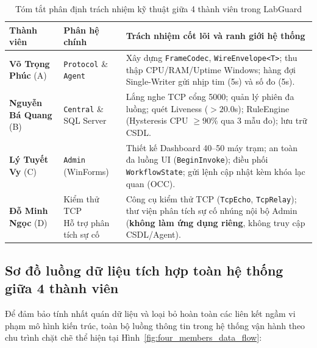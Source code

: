 \documentclass[12pt,a4paper]{article}
\begin{document}
\begin{table}[H]
  \centering
  \caption{Tóm tắt phân định trách nhiệm kỹ thuật giữa 4 thành viên trong LabGuard}
  \label{tab:team_responsibilities}
  \small
  \begin{tabularx}{\textwidth}{|l|l|X|}
    \hline
    \rowcolor{lgDeepBlue}
    \color{white}\textbf{Thành viên} & \color{white}\textbf{Phân hệ chính} & \color{white}\textbf{Trách nhiệm cốt lõi và ranh giới hệ thống} \\
    \hline
    \textbf{Võ Trọng Phúc} (A) & \texttt{Protocol} \& \texttt{Agent} & Xây dựng \texttt{FrameCodec}, \texttt{WireEnvelope<T>}; thu thập CPU/RAM/Uptime Windows; hàng đợi Single-Writer gửi nhịp tim (5s) và số đo (5s). \\
    \hline
    \textbf{Nguyễn Bá Quang} (B) & \texttt{Central} \& SQL Server & Lắng nghe TCP cổng 5000; quản lý phiên đa luồng; quét Liveness ($> 20.0$s); RuleEngine (Hysteresis CPU $\ge 90\%$ qua 3 mẫu đo); lưu trữ CSDL. \\
    \hline
    \textbf{Lý Tuyết Vy} (C) & \texttt{Admin} (WinForms) & Thiết kế Dashboard 40--50 máy trạm; an toàn đa luồng UI (\texttt{BeginInvoke}); điều phối \texttt{WorkflowState}; gửi lệnh cập nhật kèm khóa lạc quan (OCC). \\
    \hline
    \textbf{Đỗ Minh Ngọc} (D) & \makecell[l]{Kiểm thử TCP\\Hỗ trợ phân tích sự cố} & Công cụ kiểm thử TCP (\texttt{TcpEcho}, \texttt{TcpRelay}); thư viện phân tích sự cố nhúng nội bộ Admin (\textbf{không làm ứng dụng riêng}, không truy cập CSDL/Agent). \\
    \hline
  \end{tabularx}
\end{table}

\subsection{Sơ đồ luồng dữ liệu tích hợp toàn hệ thống giữa 4 thành viên}

Để đảm bảo tính nhất quán dữ liệu và loại bỏ hoàn toàn các liên kết ngầm vi phạm mô hình kiến trúc, toàn bộ luồng thông tin trong hệ thống vận hành theo chu trình chặt chẽ thể hiện tại Hình~\ref{fig:four_members_data_flow}:
\end{document}
